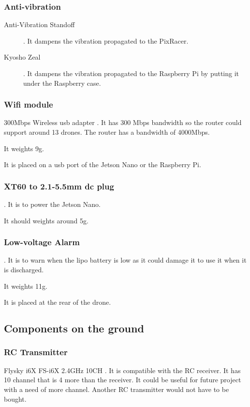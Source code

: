 \subsubsection{Anti-vibration}
\begin{description}
    \item[Anti-Vibration Standoff] \cite{bangood_standoff}. It dampens the vibration propagated to the PixRacer.
    \item[Kyosho Zeal] \cite{amazon_kyosho}. It dampens the vibration propagated to the Raspberry Pi by putting it under the Raspberry case.
\end{description}

\subsubsection{Wifi module}
300Mbps Wireless usb adapter \cite{amazon_panda_wifi_module}. It has 300 Mbps bandwidth so the router could support around 13 drones. The router has a bandwidth of 4000Mbps.

It weights 9g.

It is placed on a usb port of the Jetson Nano or the Raspberry Pi.

\subsubsection{XT60 to 2.1-5.5mm dc plug}
\cite{bangood_xt60_connector}. It is to power the Jetson Nano.

It should weights around 5g.

\subsubsection{Low-voltage Alarm}
\cite{bangood_battery_monitor}. It is to warn when the lipo battery is low as it could damage it to use it when it is discharged.

It weights 11g.

It is placed at the rear of the drone.

\subsection{Components on the ground}

\subsubsection{RC Transmitter}
Flysky i6X FS-i6X 2.4GHz 10CH \cite{bangood_transmitter}. It is compatible with the RC receiver. It has 10 channel that is 4 more than the receiver. It could be useful for future project with a need of more channel. Another RC transmitter would not have to be bought.


